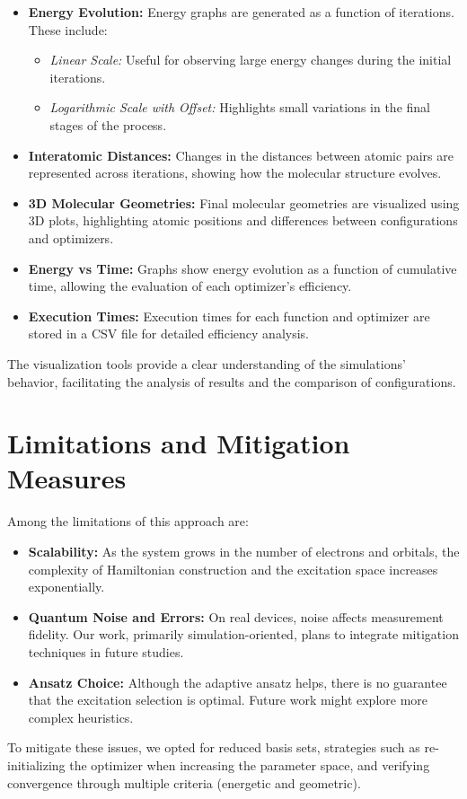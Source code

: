 \begin{itemize}
    \item \textbf{Energy Evolution:} Energy graphs are generated as a function of iterations. These include:
    \begin{itemize}
        \item \textit{Linear Scale:} Useful for observing large energy changes during the initial iterations.
        \item \textit{Logarithmic Scale with Offset:} Highlights small variations in the final stages of the process.
    \end{itemize}

    \item \textbf{Interatomic Distances:} Changes in the distances between atomic pairs are represented across iterations, showing how the molecular structure evolves.

    \item \textbf{3D Molecular Geometries:} Final molecular geometries are visualized using 3D plots, highlighting atomic positions and differences between configurations and optimizers.

    \item \textbf{Energy vs Time:} Graphs show energy evolution as a function of cumulative time, allowing the evaluation of each optimizer's efficiency.

    \item \textbf{Execution Times:} Execution times for each function and optimizer are stored in a CSV file for detailed efficiency analysis.
\end{itemize}

The visualization tools provide a clear understanding of the simulations' behavior, facilitating the analysis of results and the comparison of configurations.

\section{Limitations and Mitigation Measures}

Among the limitations of this approach are:
\begin{itemize}
    \item \textbf{Scalability:} As the system grows in the number of electrons and orbitals, the complexity of Hamiltonian construction and the excitation space increases exponentially.
    \item \textbf{Quantum Noise and Errors:} On real devices, noise affects measurement fidelity. Our work, primarily simulation-oriented, plans to integrate mitigation techniques in future studies.
    \item \textbf{Ansatz Choice:} Although the adaptive ansatz helps, there is no guarantee that the excitation selection is optimal. Future work might explore more complex heuristics.
\end{itemize}

To mitigate these issues, we opted for reduced basis sets, strategies such as re-initializing the optimizer when increasing the parameter space, and verifying convergence through multiple criteria (energetic and geometric).
